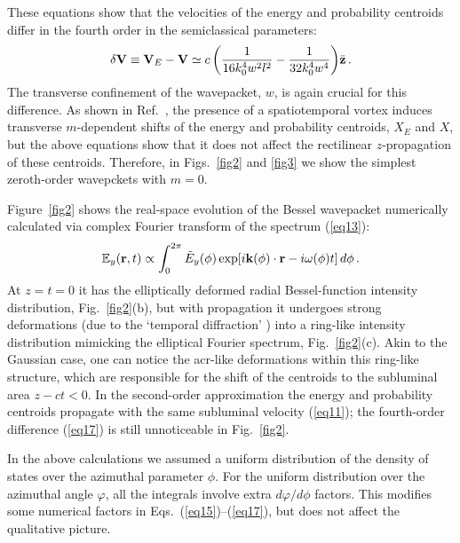 \documentclass[12pt, a4paper, superscriptaddress, final]{iopart}
\begin{document}
These equations show that the velocities of the energy and probability centroids differ in the fourth order in the semiclassical parameters:
%
\begin{align}
\label{eq17}
\delta {\bf V} \equiv {\bf V}_E - {\bf V} \simeq c \left(\frac{1}{16 k_0^4 w^2l^2} - \frac{1}{32 k_0^4 w^4} \right)\! \bar{\bf z}\,.
\end{align}
%
The transverse confinement of the wavepacket, $w$, is again crucial for this difference. As shown in Ref.~\cite{Bliokh2023}, the presence of a spatiotemporal vortex induces transverse $m$-dependent shifts of the energy and probability centroids, $X_E$ and $X$, but the above equations show that it does not affect the rectilinear $z$-propagation of these centroids. Therefore, in Figs.~\ref{fig2} and \ref{fig3} we show the simplest zeroth-order wavepckets with $m=0$.

Figure~\ref{fig2} shows the real-space evolution of the Bessel wavepacket numerically calculated via complex Fourier transform of the spectrum (\ref{eq13}):
%
\begin{equation}
\label{eq18}
{\mathbb E}_y ({\bf r},t) \propto \int_0^{2\pi} \tilde{E}_y (\phi) \exp\!\left[ i {\bf k}(\phi)\cdot {\bf r} - i \omega(\phi) t\right] d\phi\,.
 \end{equation}
%	
At $z=t=0$ it has the elliptically deformed radial Bessel-function intensity distribution, Fig.~\ref{fig2}(b), but with propagation it undergoes strong deformations (due to the `temporal diffraction' \cite{Bliokh2021}) into a ring-like intensity distribution mimicking the elliptical Fourier spectrum, Fig.~\ref{fig2}(c). Akin to the Gaussian case, one can notice the acr-like deformations within this ring-like structure, which are responsible for the shift of the centroids to the subluminal area $z-ct<0$. In the second-order approximation the energy and probability centroids propagate with the same subluminal velocity (\ref{eq11}); the fourth-order difference (\ref{eq17}) is still unnoticeable in Fig.~\ref{fig2}.

In the above calculations we assumed a uniform distribution of the density of states over the azimuthal parameter $\phi$. For the uniform distribution over the azimuthal angle $\varphi$, all the integrals involve extra $d\varphi/d\phi$ factors. This modifies some numerical factors in Eqs.~(\ref{eq15})--(\ref{eq17}), but does not affect the qualitative picture.   
\end{document}
